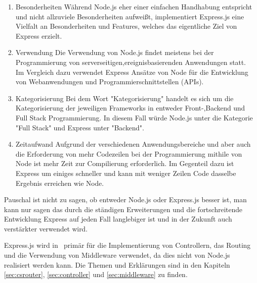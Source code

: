 \begin{enumerate}
    \item Besonderheiten
    \newline
    Während Node.js eher einer einfachen Handhabung entspricht und nicht allzuviele Besonderheiten aufweißt, implementiert Express.js eine Vielfalt an Besonderheiten und Features, welches das eigentliche Ziel von Express erzielt.\cite{NodeExp}
    \item Verwendung
    \newline
    Die Verwendung von Node.js findet meistens bei der Programmierung von serverseitigen,ereignisbasierenden Anwendungen statt. Im Vergleich dazu verwendet Express Ansätze von Node für die Entwicklung von Webanwendungen und Programmierschnittstellen (APIs).\cite{NodeExp}
    \item Kategorisierung
    \newline
    Bei dem Wort "Kategorisierung" handelt es sich um die Kategorisierung der jeweiligen Frameworks in entweder Front-,Backend und Full Stack Programmierung. In diesem Fall würde Node.js unter die Kategorie "Full Stack" und Express unter "Backend".\cite{NodeExp}
    \item Zeitaufwand
    \newline
    Aufgrund der verschiedenen Anwendungsbereiche und aber auch die Erforderung von mehr Codezeilen bei der Programmierung mithile von Node ist mehr Zeit zur Compilierung erforderlich. Im Gegenteil dazu ist Express um einiges schneller und kann mit weniger Zeilen Code dasselbe Ergebnis erreichen wie Node.\cite{NodeExp}
\end{enumerate} 

Pauschal ist nicht zu sagen, ob entweder Node.js oder Express.js besser ist, man kann nur sagen das durch die ständigen Erweiterungen und die fortschreitende Entwicklung Express auf jeden Fall langlebiger ist und in der Zukunft auch verstärkter verwendet wird. \cite{NodeExp}

Express.js wird in \ZELIA\ primär für die Implementierung von Controllern, das Routing und die Verwendung von Middleware verwendet, da dies nicht von Node.js realisiert werden kann. Die Themen und Erklärungen sind in den Kapiteln \ref{sec:csrouter}, \ref{sec:controller} und \ref{sec:middleware} zu finden. \cite{NodeExp}
